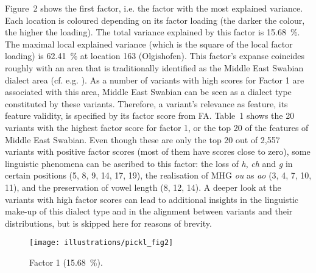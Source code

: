 \documentclass[output=paper]{LSP/langsci}
\begin{document}
Figure~2 shows the first factor, i.e. the factor with the most explained variance. Each location is coloured depending on its factor loading (the darker the colour, the higher the loading). The total variance explained by this factor is 15.68~\%. The maximal local explained variance (which is the square of the local factor loading) is 62.41~\% at location 163 (Olgishofen). This factor’s expanse coincides roughly with an area that is traditionally identified as the Middle East Swabian dialect area (cf. e.g. \citealt[118]{nubling_studien_1988}). As a number of variants with high scores for Factor 1 are associated with this area, Middle East Swabian can be seen as a dialect type constituted by these variants. Therefore, a variant’s relevance as feature, its feature validity, is specified by its factor score from FA. Table~1 shows the 20 variants with the highest factor score for factor 1, or the top 20 of the features of Middle East Swabian. Even though these are only the top 20 out of 2,557 variants with positive factor scores (most of them have scores close to zero), some linguistic phenomena can be ascribed to this factor: the loss of \textit{h}, \textit{ch} and \textit{g} in certain positions (5, 8, 9, 14, 17, 19), the realisation of MHG \textit{ou} as \textit{ao} (3, 4, 7, 10, 11), and the preservation of vowel length (8, 12, 14). A deeper look at the variants with high factor scores can lead to additional insights in the linguistic make-up of this dialect type and in the alignment between variants and their distributions, but is skipped here for reasons of brevity. 

\begin{figure}
\texttt{[image: illustrations/pickl\_fig2]}
\caption{Factor 1 (15.68~\%).}
\label{fig:2}
\end{figure}
\end{document}

